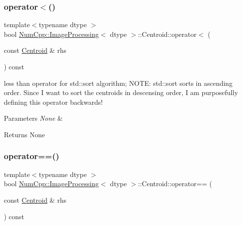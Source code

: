 \subsubsection{\texorpdfstring{operator$<$()}{operator<()}}
{\footnotesize\ttfamily template$<$typename dtype $>$ \\
bool \mbox{\hyperlink{class_num_cpp_1_1_image_processing}{Num\+Cpp\+::\+Image\+Processing}}$<$ dtype $>$\+::Centroid\+::operator$<$ (\begin{DoxyParamCaption}\item[{const \mbox{\hyperlink{class_num_cpp_1_1_image_processing_1_1_centroid}{Centroid}} \&}]{rhs }\end{DoxyParamCaption}) const\hspace{0.3cm}{\ttfamily [inline]}}

less than operator for std\+::sort algorithm; N\+O\+TE\+: std\+::sort sorts in ascending order. Since I want to sort the centroids in descensing order, I am purposefully defining this operator backwards!


\begin{DoxyParams}{Parameters}
{\em None} & \\
\hline
\end{DoxyParams}
\begin{DoxyReturn}{Returns}
None 
\end{DoxyReturn}
\mbox{\label{class_num_cpp_1_1_image_processing_1_1_centroid_af1d8473124ece484e0045b5ede56462f}} 
\subsubsection{\texorpdfstring{operator==()}{operator==()}}
{\footnotesize\ttfamily template$<$typename dtype $>$ \\
bool \mbox{\hyperlink{class_num_cpp_1_1_image_processing}{Num\+Cpp\+::\+Image\+Processing}}$<$ dtype $>$\+::Centroid\+::operator== (\begin{DoxyParamCaption}\item[{const \mbox{\hyperlink{class_num_cpp_1_1_image_processing_1_1_centroid}{Centroid}} \&}]{rhs }\end{DoxyParamCaption}) const\hspace{0.3cm}{\ttfamily [inline]}}

